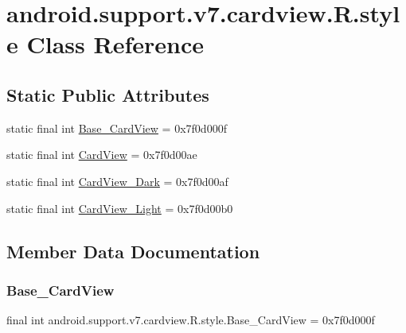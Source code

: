 \hypertarget{classandroid_1_1support_1_1v7_1_1cardview_1_1R_1_1style}{}\section{android.\+support.\+v7.\+cardview.\+R.\+style Class Reference}
\label{classandroid_1_1support_1_1v7_1_1cardview_1_1R_1_1style}
\subsection*{Static Public Attributes}
\begin{DoxyCompactItemize}
\item 
static final int \mbox{\hyperlink{classandroid_1_1support_1_1v7_1_1cardview_1_1R_1_1style_a9319fb6cb5fb4cd31ac8904351f882d1}{Base\+\_\+\+Card\+View}} = 0x7f0d000f
\item 
static final int \mbox{\hyperlink{classandroid_1_1support_1_1v7_1_1cardview_1_1R_1_1style_a71c5097a6ed7b17659d66f944cc0cd21}{Card\+View}} = 0x7f0d00ae
\item 
static final int \mbox{\hyperlink{classandroid_1_1support_1_1v7_1_1cardview_1_1R_1_1style_a830d3d71ffb67651beff65190f8928ec}{Card\+View\+\_\+\+Dark}} = 0x7f0d00af
\item 
static final int \mbox{\hyperlink{classandroid_1_1support_1_1v7_1_1cardview_1_1R_1_1style_a4d877f8bd43980509fc9604da45c44d8}{Card\+View\+\_\+\+Light}} = 0x7f0d00b0
\end{DoxyCompactItemize}


\subsection{Member Data Documentation}
\mbox{\label{classandroid_1_1support_1_1v7_1_1cardview_1_1R_1_1style_a9319fb6cb5fb4cd31ac8904351f882d1}} 
\subsubsection{\texorpdfstring{Base\+\_\+\+Card\+View}{Base\_CardView}}
{\footnotesize\ttfamily final int android.\+support.\+v7.\+cardview.\+R.\+style.\+Base\+\_\+\+Card\+View = 0x7f0d000f\hspace{0.3cm}{\ttfamily [static]}}

